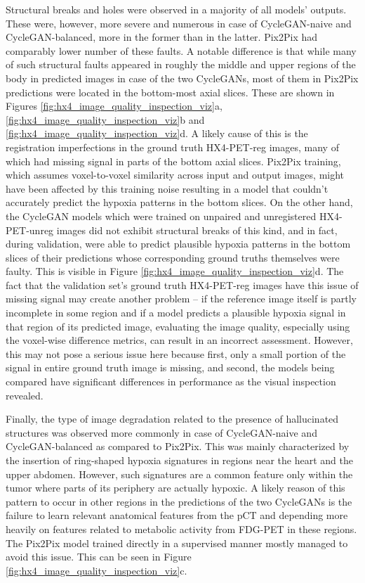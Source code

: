 Structural breaks and holes were observed in a majority of all models' outputs. These were, however, more severe and numerous in case of CycleGAN-naive and CycleGAN-balanced, more in the former than in the latter. Pix2Pix had comparably lower number of these faults. A notable difference is that while many of such structural faults appeared in roughly the middle and upper regions of the body in predicted images in case of the two CycleGANs, most of them in Pix2Pix predictions were located in the bottom-most axial slices. These are shown in Figures \ref{fig:hx4_image_quality_inspection_viz}a, \ref{fig:hx4_image_quality_inspection_viz}b and \ref{fig:hx4_image_quality_inspection_viz}d. A likely cause of this is the registration imperfections in the ground truth HX4-PET-reg images, many of which had missing signal in parts of the bottom axial slices. Pix2Pix training, which assumes voxel-to-voxel similarity across input and output images, might have been affected by this training noise resulting in a model that couldn't accurately predict the hypoxia patterns in the bottom slices. On the other hand, the CycleGAN models which were trained on unpaired and unregistered HX4-PET-unreg images did not exhibit structural breaks of this kind, and in fact, during validation, were able to predict plausible hypoxia patterns in the bottom slices of their predictions whose corresponding ground truths themselves were faulty. This is visible in Figure \ref{fig:hx4_image_quality_inspection_viz}d. The fact that the validation set's ground truth HX4-PET-reg images have this issue of missing signal may create another problem -- if the reference image itself is partly incomplete in some region and if a model predicts a plausible hypoxia signal in that region of its predicted image, evaluating the image quality, especially using the voxel-wise difference metrics, can result in an incorrect assessment. However, this may not pose a serious issue here because first, only a small portion of the signal in entire ground truth image is missing, and second, the models being compared have significant differences in performance as the visual inspection revealed.

Finally, the type of image degradation related to the presence of hallucinated structures was observed more commonly in case of CycleGAN-naive and CycleGAN-balanced as compared to Pix2Pix. This was mainly characterized by the insertion of ring-shaped hypoxia signatures in regions near the heart and the upper abdomen. However, such signatures are a common feature only within the tumor where parts of its periphery are actually hypoxic. A likely reason of this pattern to occur in other regions in the predictions of the two CycleGANs is the failure to learn relevant anatomical features from the pCT and depending more heavily on features related to metabolic activity from FDG-PET in these regions. The Pix2Pix model trained directly in a supervised manner mostly managed to avoid this issue. This can be seen in Figure \ref{fig:hx4_image_quality_inspection_viz}c.

